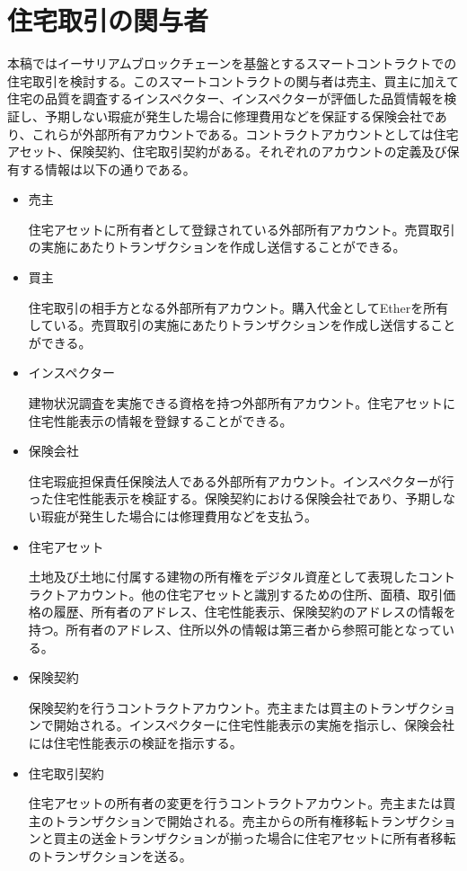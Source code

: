 \documentclass[a4paper,fontsize=11pt,report,notitlepage,line_length=38zw,number_of_lines=40,dvipdfmx]{jlreq}
\begin{document}
\section{住宅取引の関与者}
本稿ではイーサリアムブロックチェーンを基盤とするスマートコントラクトでの住宅取引を検討する。このスマートコントラクトの関与者は売主、買主に加えて住宅の品質を調査するインスペクター、インスペクターが評価した品質情報を検証し、予期しない瑕疵が発生した場合に修理費用などを保証する保険会社であり、これらが外部所有アカウントである。コントラクトアカウントとしては住宅アセット、保険契約、住宅取引契約がある。それぞれのアカウントの定義及び保有する情報は以下の通りである。
\begin{itemize}
	\item 売主
    \par 住宅アセットに所有者として登録されている外部所有アカウント。売買取引の実施にあたりトランザクションを作成し送信することができる。
    \item 買主
    \par 住宅取引の相手方となる外部所有アカウント。購入代金としてEtherを所有している。売買取引の実施にあたりトランザクションを作成し送信することができる。
    \item インスペクター
    \par 建物状況調査を実施できる資格を持つ外部所有アカウント。住宅アセットに住宅性能表示の情報を登録することができる。
    \item 保険会社
    \par 住宅瑕疵担保責任保険法人である外部所有アカウント。インスペクターが行った住宅性能表示を検証する。保険契約における保険会社であり、予期しない瑕疵が発生した場合には修理費用などを支払う。
	\item 住宅アセット	
	\par 土地及び土地に付属する建物の所有権をデジタル資産として表現したコントラクトアカウント。他の住宅アセットと識別するための住所、面積、取引価格の履歴、所有者のアドレス、住宅性能表示、保険契約のアドレスの情報を持つ。所有者のアドレス、住所以外の情報は第三者から参照可能となっている。
	\item 保険契約
    \par 保険契約を行うコントラクトアカウント。売主または買主のトランザクションで開始される。インスペクターに住宅性能表示の実施を指示し、保険会社には住宅性能表示の検証を指示する。
    \item 住宅取引契約
    \par 住宅アセットの所有者の変更を行うコントラクトアカウント。売主または買主のトランザクションで開始される。売主からの所有権移転トランザクションと買主の送金トランザクションが揃った場合に住宅アセットに所有者移転のトランザクションを送る。
\end{itemize}
\end{document}
